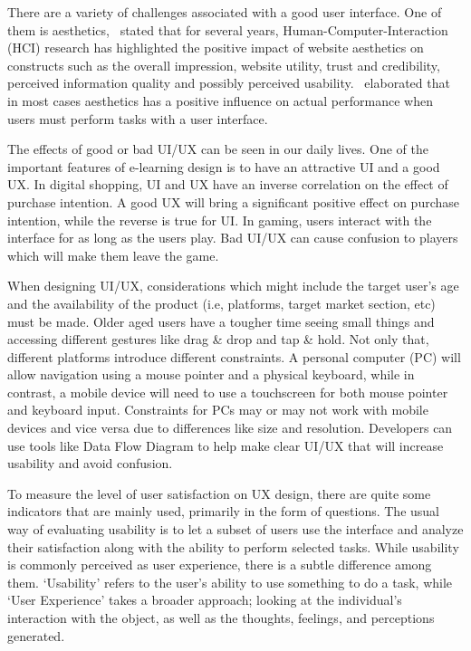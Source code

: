 \documentclass[conference]{IEEEtran}
\begin{document}
There are a variety of challenges associated with a good user interface. One of them is aesthetics,~\cite{GlenaH} stated that for several years, Human-Computer-Interaction (HCI) research has highlighted the positive impact of website aesthetics on constructs such as the overall impression, website utility, trust and credibility, perceived information quality and possibly perceived usability.~\cite{SchmidtWolff+2018+41+55} elaborated that in most cases aesthetics has a positive influence on actual performance when users must perform tasks with a user interface.

The effects of good or bad UI/UX can be seen in our daily lives. One of the important features of e-learning design is to have an attractive UI and a good UX\cite{Handayani2020GamifiedLP}. In digital shopping, UI and UX have an inverse correlation on the effect of purchase intention\cite{Watulingas}. A good UX will bring a significant positive effect on purchase intention, while the reverse is true for UI\cite{Watulingas}. In gaming, users interact with the interface for as long as the users play. Bad UI/UX can cause confusion to players which will make them leave the game\cite{Kurniawan2021UIUXMG}.

When designing UI/UX, considerations which might include the target user's age and the availability of the product (i.e, platforms, target market section, etc) must be made. Older aged users have a tougher time seeing small things and accessing different gestures like drag \& drop and tap \& hold\cite{Salman2018UsabilityEO}. Not only that, different platforms introduce different constraints. A personal computer (PC) will allow navigation using a mouse pointer and a physical keyboard, while in contrast, a mobile device will need to use a touchscreen for both mouse pointer and keyboard input. Constraints for PCs may or may not work with mobile devices and vice versa due to differences like size and resolution\cite{Garca2017ValidationON}. Developers can use tools like Data Flow Diagram to help make clear UI/UX that will increase usability and avoid confusion\cite{Wulandari2017DesignDF}.

To measure the level of user satisfaction on UX design, there are quite some indicators that are mainly used, primarily in the form of questions. The usual way of evaluating usability is to let a subset of users use the interface and analyze their satisfaction along with the ability to perform selected tasks\cite{Pastushenko}. While usability is commonly perceived as user experience, there is a subtle difference among them. `Usability' refers to the user's ability to use something to do a task, while `User Experience' takes a broader approach; looking at the individual's interaction with the object, as well as the thoughts, feelings, and perceptions generated\cite{Erlinda}.
\end{document}
